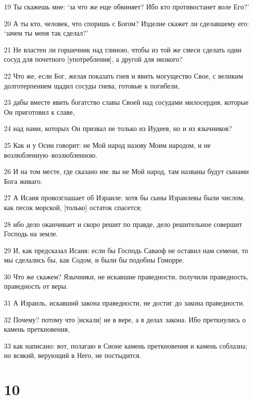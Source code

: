 \par 19 Ты скажешь мне: `за что же еще обвиняет? Ибо кто противостанет воле Его?'
\par 20 А ты кто, человек, что споришь с Богом? Изделие скажет ли сделавшему его: `зачем ты меня так сделал?'
\par 21 Не властен ли горшечник над глиною, чтобы из той же смеси сделать один сосуд для почетного [употребления], а другой для низкого?
\par 22 Что же, если Бог, желая показать гнев и явить могущество Свое, с великим долготерпением щадил сосуды гнева, готовые к погибели,
\par 23 дабы вместе явить богатство славы Своей над сосудами милосердия, которые Он приготовил к славе,
\par 24 над нами, которых Он призвал не только из Иудеев, но и из язычников?
\par 25 Как и у Осии говорит: не Мой народ назову Моим народом, и не возлюбленную--возлюбленною.
\par 26 И на том месте, где сказано им: вы не Мой народ, там названы будут сынами Бога живаго.
\par 27 А Исаия провозглашает об Израиле: хотя бы сыны Израилевы были числом, как песок морской, [только] остаток спасется;
\par 28 ибо дело оканчивает и скоро решит по правде, дело решительное совершит Господь на земле.
\par 29 И, как предсказал Исаия: если бы Господь Саваоф не оставил нам семени, то мы сделались бы, как Содом, и были бы подобны Гоморре.
\par 30 Что же скажем? Язычники, не искавшие праведности, получили праведность, праведность от веры.
\par 31 А Израиль, искавший закона праведности, не достиг до закона праведности.
\par 32 Почему? потому что [искали] не в вере, а в делах закона. Ибо преткнулись о камень преткновения,
\par 33 как написано: вот, полагаю в Сионе камень преткновения и камень соблазна; но всякий, верующий в Него, не постыдится.

\chapter{10}

